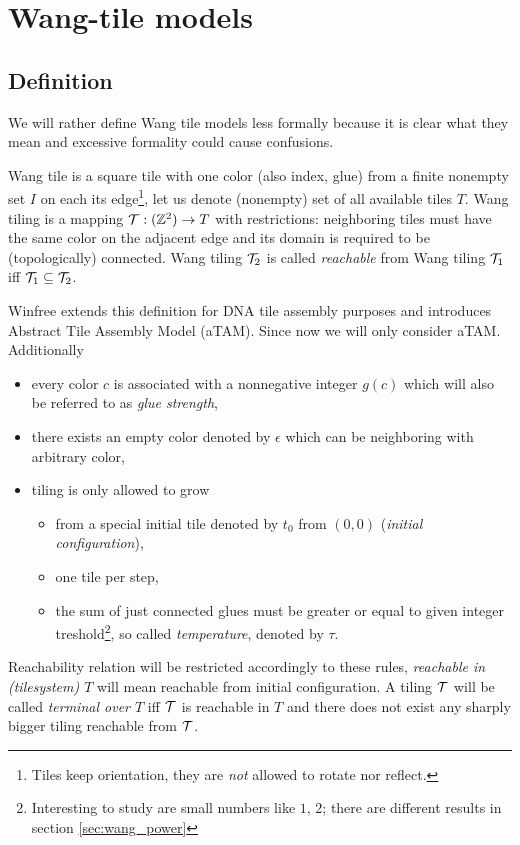 
\section{Wang-tile models}

\subsection{Definition}
	
	
	We will rather define Wang tile models less formally because it is clear what they mean and excessive formality could cause confusions.
	
	Wang tile is a square tile with one color (also index, glue) from a finite nonempty set $I$ on each its edge\footnote{Tiles keep orientation, they are {\em not} allowed to rotate nor reflect.}, let us denote (nonempty) set of all available tiles $T$. Wang tiling is a mapping ${\cal T}: (\mathbb{Z}^2) \rightarrow T$ with restrictions: neighboring tiles must have the same color on the adjacent edge and its domain is required to be (topologically) connected. Wang tiling ${\cal T}_2$ is called {\em reachable} from Wang tiling ${\cal T}_1$ iff ${\cal T}_1 \subseteq {\cal T}_2$. %
	
	Winfree extends this definition for DNA tile assembly purposes and introduces Abstract Tile Assembly Model (aTAM). Since now we will only consider aTAM. Additionally
	\begin{itemize}
		\item every color $c$ is associated with a nonnegative integer $g(c)$ which will also be referred to as {\em glue strength},
		\item there exists an empty color denoted by $\epsilon$ which can be neighboring with arbitrary color,
		\item tiling is only allowed to grow
		\begin{itemize}
			\item from a special initial tile denoted by $t_0$ from $(0,0)$ ({\em initial configuration}),
			\item one tile per step,
			\item the sum of just connected glues must be greater or equal to given integer treshold\footnote{Interesting to study are small numbers like $1$, $2$; there are different results in section \ref{sec:wang_power}}, so called {\em temperature}, denoted by $\tau$.
		\end{itemize}
	\end{itemize}
	Reachability relation will be restricted accordingly to these rules, {\em reachable in (tilesystem) $T$} will mean reachable from initial configuration. A tiling $\cal T$ will be called {\em terminal over $T$} iff $\cal T$ is reachable in $T$ and there does not exist any sharply bigger tiling reachable from $\cal T$.
	

